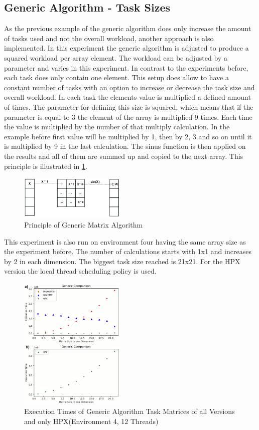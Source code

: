 \subsection{Generic Algorithm - Task Sizes}
\label{subsec:genAlgo}
As the previous example of the generic algorithm does only increase the amount of tasks used and not the overall workload, another approach is also implemented.
In this experiment the generic algorithm is adjusted to produce a squared workload per array element.
The workload can be adjusted by a parameter and varies in this experiment.
In contrast to the experiments before, each task does only contain one element.
This setup does allow to have a constant number of tasks with an option to increase or decrease the task size and overall workload.
In each task the elements value is multiplied a defined amount of times.
The parameter for defining this size is squared, which means that if the parameter is equal to 3 the element of the array is multiplied 9 times.
Each time the value is multiplied by the number of that multiply calculation.
In the example before first value will be multiplied by 1, then by 2, 3 and so on until it is multiplied by 9 in the last calculation.
The sinus function is then applied on the results and all of them are summed up and copied to the next array.
This principle is illustrated in \ref{fig:genMatrix_algo}.
\begin{figure}[h]
	\centering
	\includegraphics[width=0.45\textwidth]{figures/genericMatrix_algo.png}
	\caption{Principle of Generic Matrix Algorithm}
	\label{fig:genMatrix_algo}
\end{figure}

This experiment is also run on environment four having the same array size as the experiment before.
The number of calculations starts with 1x1 and increases by 2 in each dimension.
The biggest task size reached is 21x21.
For the HPX version the local thread scheduling policy is used.
\begin{figure}[h]
	\centering
	\includegraphics[width=0.45\textwidth]{figures/genericMatrix.png}
	\caption{Execution Times of Generic Algorithm Task Matrices of all Versions and only HPX(Environment 4, 12 Threads)}
	\label{fig:genMatrix}
\end{figure}


